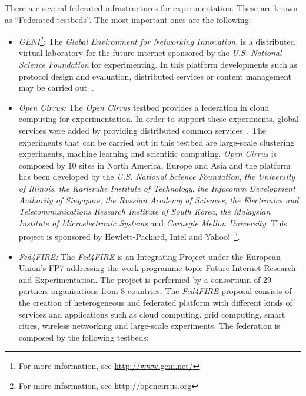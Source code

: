 There are several federated infrastructures for experimentation. These are known
as ``Federated testbeds''. The most important ones are the following:
\begin{itemize}
\item \emph{GENI\footnote{For more information, see
  \url{http://www.geni.net/}}}: The \emph{Global Environment for Networking Innovation}, is a distributed virtual
laboratory for the future internet sponsored by the \emph{U.S. National Science Foundation} for
experimenting. In this platform developments such as protocol
design and evaluation, distributed services or content management may be carried
out~\cite{Berman2014}.
\item \emph{Open
  Cirrus:} The \emph{Open Cirrus} testbed provides a federation in cloud computing for
experimentation. In order to support these experiments, global services were added by
providing distributed common services~\cite{Avetisyan2010}. The experiments that can be carried out
in this testbed are large-scale clustering experiments, machine learning and scientific computing. \emph{Open Cirrus} is composed by 10 sites in North
America, Europe and Asia and the platform has been developed by the
\emph{U.S. National Science Foundation}, \emph{the University of
  Illinois},\emph{ the Karlsruhe Institute of Technology}, \emph{the Infocomm Development Authority of Singapore},\emph{ the
Russian Academy of Sciences}, \emph{the Electronics and Telecommunications Research
Institute of South Korea}, \emph{the Malaysian Institute of Microelectronic
  Systems} and \emph{Carnegie Mellon University}. This project is sponsored by Hewlett-Packard, Intel
and Yahoo!~\footnote{For more information, see \url{http://opencirrus.org}}.

\item \emph{Fed4FIRE:} The \emph{Fed4FIRE} is an Integrating Project under the European
Union's \ac{FP7} addressing the work programme topic Future Internet Research
and Experimentation. The project is performed by a consortium of 29 partners
organisations from 8 countries. The \emph{Fed4FIRE}  proposal consists of the
creation of heterogeneous and federated platform with different kinds of services and applications such
as cloud computing, grid computing, smart cities, wireless networking and
large-scale experiments. The federation is composed by the following testbeds:


\end{itemize}
